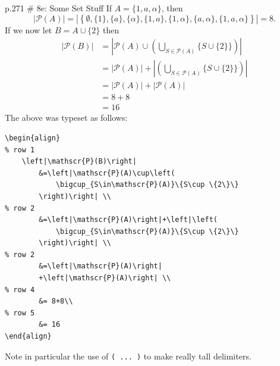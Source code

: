 \documentclass[12pt]{article}
\begin{document}

\begin{problem}{p.271 \# 8e: Some Set Stuff}
    If \(A=\{1,a,\alpha\}\), then
    \[
        \left|\mathscr{P}(A)\right|=\left|\left\{
            \emptyset, \{1\},\{a\},\{\alpha\},
            \{1,a\},\{1,\alpha\},
            \{a,\alpha\},\{1,a,\alpha\}
        \right\}\right|=8.
    \]
    If we now let $B=A\cup \{2\}$ then
    \begin{align}
        \left|\mathscr{P}(B)\right| 
            &=\left|\mathscr{P}(A)\cup\left(
                \bigcup_{S\in\mathscr{P}(A)}\{S\cup \{2\}\}
            \right)\right| \\
            &=\left|\mathscr{P}(A)\right|+\left|\left(
                \bigcup_{S\in\mathscr{P}(A)}\{S\cup \{2\}\}
            \right)\right| \\
            &=\left|\mathscr{P}(A)\right|
            +\left|\mathscr{P}(A)\right| \\
            &= 8+8\\
            &= 16
    \end{align}
    The above was typeset as follows:
    
\begin{verbatim}
\begin{align}
% row 1
    \left|\mathscr{P}(B)\right| 
        &=\left|\mathscr{P}(A)\cup\left(
            \bigcup_{S\in\mathscr{P}(A)}\{S\cup \{2\}\}
        \right)\right| \\
% row 2
        &=\left|\mathscr{P}(A)\right|+\left|\left(
            \bigcup_{S\in\mathscr{P}(A)}\{S\cup \{2\}\}
        \right)\right| \\
% row 2
        &=\left|\mathscr{P}(A)\right|
        +\left|\mathscr{P}(A)\right| \\
% row 4
        &= 8+8\\
% row 5
        &= 16
\end{align}
\end{verbatim}

    \noindent
    Note in particular the use of \texttt{\left( ... \right)} to make really tall delimiters.
\end{problem}


\end{document}
